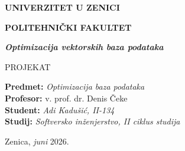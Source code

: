 \begin{titlepage}
    \centering
    
    {\bfseries\large UNIVERZITET U ZENICI \par}
    {\bfseries\large POLITEHNIČKI FAKULTET \par}
    
    \vspace{6.5cm}
    
    {\bfseries\itshape\LARGE Optimizacija vektorskih baza podataka \par}
    
    \vspace{0.8cm}
    
    {\large PROJEKAT \par}
    
    \vspace{3cm}
    
    \begin{flushleft}
        \large
        \textbf{Predmet:} \textit{Optimizacija baza podataka} \\
        \textbf{Profesor:} v. prof. dr. Denis Čeke \\
        \textbf{Student:} \textit{Adi Kadušić, II-134} \\
        \textbf{Studij:} \textit{Softversko inženjerstvo, II ciklus studija}
    \end{flushleft}
    
    \vfill
    
    {\large Zenica, \textit{juni} 2026. \par}

\end{titlepage}
